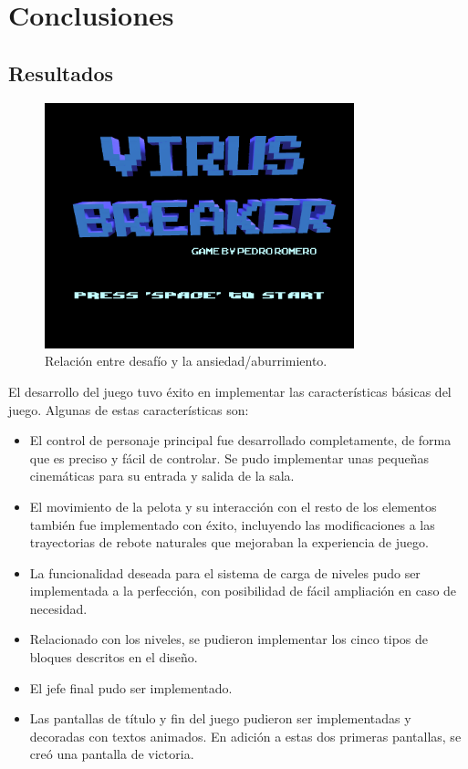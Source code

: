\chapter{Conclusiones}
\label{chap:conclusiones}
\section{Resultados}
\begin{figure}[h]
	\includegraphics[width=0.8\textwidth]{images/futuro/resultado/captura-title}
	\centering
	\caption{Relación entre desafío y la ansiedad/aburrimiento.}
\end{figure}
El desarrollo del juego tuvo éxito en implementar las características básicas del juego. Algunas de estas características son: 
\begin{itemize}
\item El control de personaje principal fue desarrollado completamente, de forma que es preciso y fácil de controlar. Se pudo implementar unas pequeñas cinemáticas para su entrada y salida de la sala.
\item El movimiento de la pelota y su interacción con el resto de los elementos también fue implementado con éxito, incluyendo las modificaciones a las trayectorias de rebote naturales que mejoraban la experiencia de juego. 
\item La funcionalidad deseada para el sistema de carga de niveles pudo ser implementada a la perfección, con posibilidad de fácil ampliación en caso de necesidad.
\item Relacionado con los niveles, se pudieron implementar los cinco tipos de bloques descritos en el diseño.
\item El jefe final pudo ser implementado. 
\item Las pantallas de título y fin del juego pudieron ser implementadas y decoradas con textos animados. En adición a estas dos primeras pantallas, se creó una pantalla de victoria.
\end{itemize}


